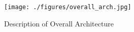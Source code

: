 \documentclass[conference]{IEEEtran}
\begin{document}

\begin{figure}
\centering
\texttt{[image: ./figures/overall\_arch.jpg]}
\caption{Description of Overall Architecture}
\label{overall}
\end{figure}









\end{document}
